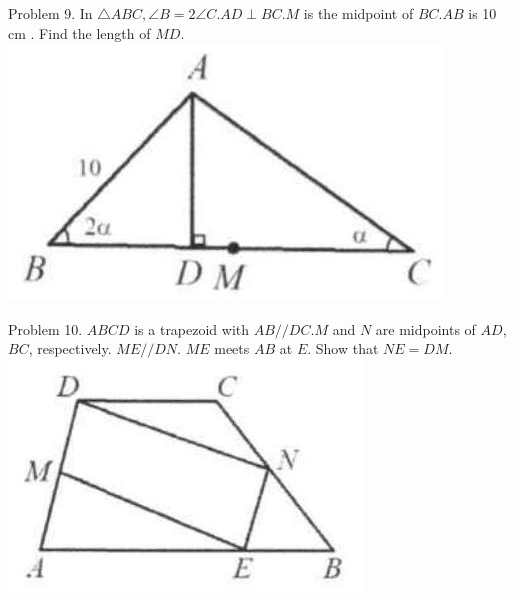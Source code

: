 \documentclass[10pt]{article}
\begin{document}
Problem 9. In \(\triangle A B C, \angle B=2 \angle C . A D \perp B C . M\) is the midpoint of \(B C . A B\) is 10 cm . Find the length of \(M D\).\\
\includegraphics[max width=\textwidth, center]{2025_04_17_97bc1f7e44d93c271a88g-045(4)}

Problem 10. \(A B C D\) is a trapezoid with \(A B / / D C . M\) and \(N\) are midpoints of \(A D\), \(B C\), respectively. \(M E / / D N\). \(M E\) meets \(A B\) at \(E\). Show that \(N E=D M\).\\
\includegraphics[max width=\textwidth, center]{2025_04_17_97bc1f7e44d93c271a88g-045(2)}
\end{document}
